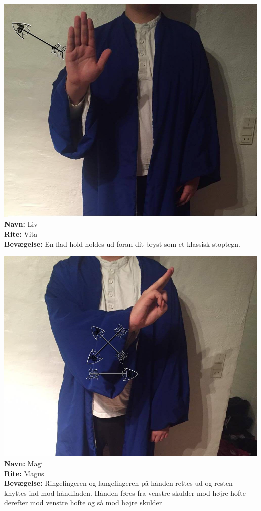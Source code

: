 \begin{rite*}[Liv]
    \centering
    \includegraphics[width=\textwidth]{mainstuff/riteBilleder/Liv.png}
\Large \textbf{Navn:} Liv\\
\textbf{Rite:} Vita\\
\textbf{Bevægelse:} En flad hold holdes ud foran dit bryst som et klassisk stoptegn.
\end{rite*}

\begin{rite*}[Magi]
    \centering
    \includegraphics[width=\textwidth]{mainstuff/riteBilleder/Magi.png}
\Large \textbf{Navn:} Magi\\
\textbf{Rite:} Magus\\
\textbf{Bevægelse:} Ringefingeren og langefingeren på hånden rettes ud og resten knyttes ind mod håndfladen. Hånden føres fra venstre skulder mod højre hofte derefter mod venstre hofte og så mod højre skulder
\end{rite*}

